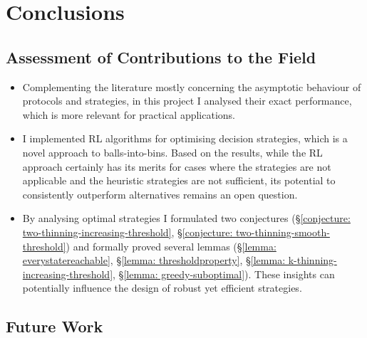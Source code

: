 
\chapter{Conclusions}\label{conclusion}

\ifpdf
    \graphicspath{{Chapter3/Figs/Raster/}{Chapter3/Figs/PDF/}{Chapter3/Figs/}}
\else
    \graphicspath{{Chapter3/Figs/Vector/}{Chapter3/Figs/}}
\fi


\section{Assessment of Contributions to the Field}


\begin{itemize}
    \item Complementing the literature mostly concerning the asymptotic behaviour of protocols and strategies, in this project I analysed their exact performance, which is more relevant for practical applications.
    \item I implemented RL algorithms for optimising decision strategies, which is a novel approach to balls-into-bins. Based on the results, while the RL approach certainly has its merits for cases where the \DP strategies are not applicable and the heuristic strategies are not sufficient, its potential to consistently outperform alternatives remains an open question.
    \item By analysing optimal strategies I formulated two conjectures (\S\ref{conjecture: two-thinning-increasing-threshold}, \S\ref{conjecture: two-thinning-smooth-threshold}) and formally proved several lemmas (\S\ref{lemma: everystatereachable}, \S\ref{lemma: thresholdproperty}, \S\ref{lemma: k-thinning-increasing-threshold}, \S\ref{lemma: greedy-suboptimal}). These insights can potentially influence the design of robust yet efficient strategies.
\end{itemize}


\section{Future Work}

